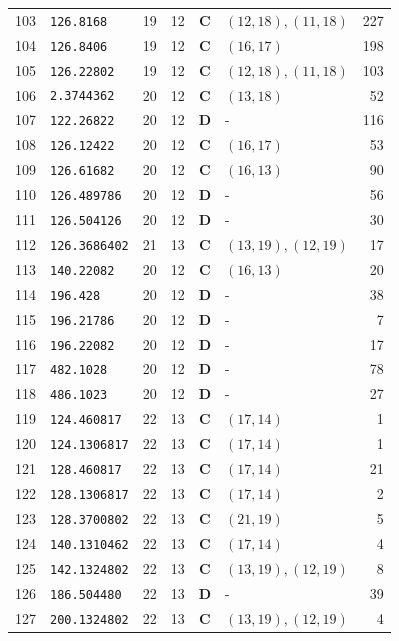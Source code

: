 \documentclass[11pt,a4paper]{article}
\begin{document}
\begin{small}
\begin{longtable}{r l c c c l r}
103 & \texttt{126.8168} & 19 & 12 & \textbf{C} & $(12,18), (11,18)$ & 227 \\
104 & \texttt{126.8406} & 19 & 12 & \textbf{C} & $(16,17)$ & 198 \\
105 & \texttt{126.22802} & 19 & 12 & \textbf{C} & $(12,18), (11,18)$ & 103 \\
106 & \texttt{2.3744362} & 20 & 12 & \textbf{C} & $(13,18)$ & 52 \\
107 & \texttt{122.26822} & 20 & 12 & \textbf{D} & - & 116 \\
108 & \texttt{126.12422} & 20 & 12 & \textbf{C} & $(16,17)$ & 53 \\
109 & \texttt{126.61682} & 20 & 12 & \textbf{C} & $(16,13)$ & 90 \\
110 & \texttt{126.489786} & 20 & 12 & \textbf{D} & - & 56 \\
111 & \texttt{126.504126} & 20 & 12 & \textbf{D} & - & 30 \\
112 & \texttt{126.3686402} & 21 & 13 & \textbf{C} & $(13,19), (12,19)$ & 17 \\
113 & \texttt{140.22082} & 20 & 12 & \textbf{C} & $(16,13)$ & 20 \\
114 & \texttt{196.428} & 20 & 12 & \textbf{D} & - & 38 \\
115 & \texttt{196.21786} & 20 & 12 & \textbf{D} & - & 7 \\
116 & \texttt{196.22082} & 20 & 12 & \textbf{D} & - & 17 \\
117 & \texttt{482.1028} & 20 & 12 & \textbf{D} & - & 78 \\
118 & \texttt{486.1023} & 20 & 12 & \textbf{D} & - & 27 \\
119 & \texttt{124.460817} & 22 & 13 & \textbf{C} & $(17,14)$ & 1 \\
120 & \texttt{124.1306817} & 22 & 13 & \textbf{C} & $(17,14)$ & 1 \\
121 & \texttt{128.460817} & 22 & 13 & \textbf{C} & $(17,14)$ & 21 \\
122 & \texttt{128.1306817} & 22 & 13 & \textbf{C} & $(17,14)$ & 2 \\
123 & \texttt{128.3700802} & 22 & 13 & \textbf{C} & $(21,19)$ & 5 \\
124 & \texttt{140.1310462} & 22 & 13 & \textbf{C} & $(17,14)$ & 4 \\
125 & \texttt{142.1324802} & 22 & 13 & \textbf{C} & $(13,19), (12,19)$ & 8 \\
126 & \texttt{186.504480} & 22 & 13 & \textbf{D} & - & 39 \\
127 & \texttt{200.1324802} & 22 & 13 & \textbf{C} & $(13,19), (12,19)$ & 4 \\

\end{longtable}
\end{small}
\end{document}
